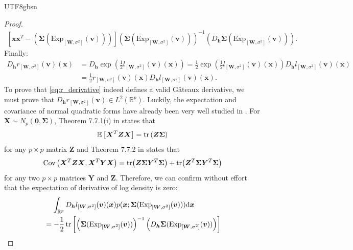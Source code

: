 \documentclass[12pt]{report}
\newcommand\tab[1][1cm]{\hspace*{#1}}
\newcommand{\bracket}[1]{\left ( #1 \right )}
\newcommand{\squared}[1]{\left [ #1 \right ]}
\theoremstyle{plain}
\theoremstyle{definition}
\begin{document}
\begin{CJK*}{UTF8}{gbsn}
\begin{proof}
\begin{equation}
\begin{split}
{  \squared{\bm{x}\bm{x}^T - \bracket{\bm{\Sigma}(\text{Exp}_{[\bm{W},\sigma^2]}(\bm{v}))}}
  \bracket{\bm{\Sigma}(\text{Exp}_{[\bm{W},\sigma^2]}(\bm{v}))}^{-1} 
  \bracket{D_{\bm{h}}\bm{\Sigma}(\text{Exp}_{[\bm{W},\sigma^2]}(\bm{v}))}}.
  \end{split}
\end{equation}
Finally:
\begin{equation}\label{eq:r_derivative}
  \begin{split}
  D_{\bm{h}}r_{[\bm{W},\sigma^2]}(\bm{v})(\bm{x})
  & = D_{\bm{h}} \exp \bracket{\frac{1}{2}l_{[\bm{W},\sigma^2]}(\bm{v})(\bm{x})}
  = \frac{1}{2} \exp \bracket{\frac{1}{2}l_{[\bm{W},\sigma^2]}(\bm{v})(\bm{x})} D_{\bm{h}}l_{[\bm{W},\sigma^2]}(\bm{v})(\bm{x})
  \\ & = \frac{1}{2} r_{[\bm{W},\sigma^2]}(\bm{v})(\bm{x}) D_{\bm{h}}l_{[\bm{W},\sigma^2]}(\bm{v})(\bm{x}).
  \end{split}
\end{equation}
To prove that \eqref{eq:r_derivative}
indeed defines a valid Gâteaux derivative,
we must prove that $D_{\bm{h}}r_{[\bm{W},\sigma^2]}(\bm{v}) \in L^2(\mathbb{R}^p)$.
Luckily, the expectation and covariance of normal 
quadratic forms have already been very well studied in 
\cite{Gupta_Nagar_2000}.
For $\bm{X} \sim N_p(\bm{0}, \bm{\Sigma})$,
Theorem 7.7.1(i) in 
\cite{Gupta_Nagar_2000}
states that 
\begin{equation*}
  \mathbb{E} \squared{\bm{X}^T \bm{Z} \bm{X}}
  = \tr \bracket{\bm{Z}\bm{\Sigma}}
\end{equation*}
for any $p \times p$ matrix $\bm{Z}$
and 
Theorem 7.7.2 in 
\cite{Gupta_Nagar_2000} states that 
\begin{equation*}
  \text{Cov} \bracket{\bm{X}^T \bm{Z} \bm{X}, \bm{X}^T \bm{Y} \bm{X}}
  = \tr(\bm{Z}\bm{\Sigma}\bm{Y}^T\bm{\Sigma}) + \tr(\bm{Z}^T\bm{\Sigma}\bm{Y}^T\bm{\Sigma})
\end{equation*} 
for any two $p \times p$ matrices $\bm{Y}$ and $\bm{Z}$.
Therefore, 
we can confirm without effort that the expectation of derivative of log density is zero:
\begin{equation*}
  \begin{split}
  & \tab[0.4cm] \int_{\mathbb{R}^p} D_{\bm{h}}l_{[\bm{W},\sigma^2]}(\bm{v})(\bm{x})
  p(\bm{x}; \bm{\Sigma}(\text{Exp}_{[\bm{W},\sigma^2]}(\bm{v})))\mathrm{d} \bm{x}
   \\ & = -\frac{1}{2} \tr 
  \squared{\bracket{\bm{\Sigma}(\text{Exp}_{[\bm{W},\sigma^2]}(\bm{v}))}^{-1}
  \bracket{D_{\bm{h}}\bm{\Sigma}(\text{Exp}_{[\bm{W},\sigma^2]}(\bm{v})) }}

\end{split}
\end{equation*}
\end{proof}
\end{CJK*}
\end{document}

